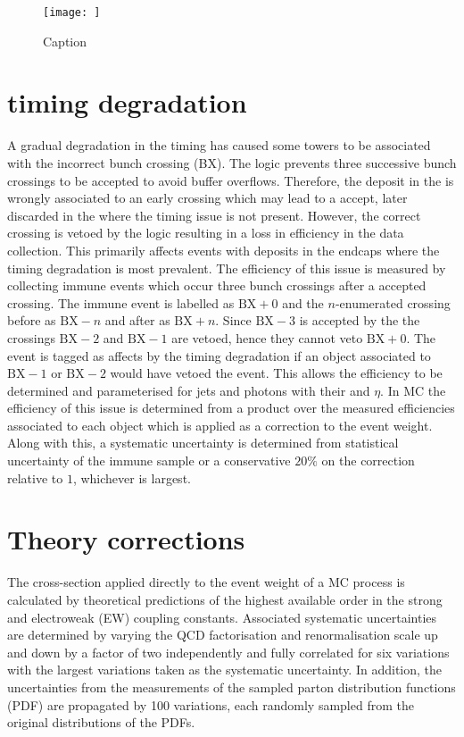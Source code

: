 \begin{figure}[htbp]
    \centering
    \texttt{[image: ]}
    \caption{Caption}
    \label{fig:pu-reweighting}
\end{figure}


\section{\ECAL timing degradation}

A gradual degradation in the \ECAL timing has caused some \HWT \ECAL towers to
be associated with the incorrect bunch crossing (BX). The \HWT logic prevents
three successive bunch crossings to be accepted to avoid buffer overflows.
Therefore, the deposit in the \ECAL is wrongly associated to an early crossing
which may lead to a \HWT accept, later discarded in the \SWT where the timing
issue is not present. However, the correct crossing is vetoed by the \HWT
logic resulting in a loss in efficiency in the data collection. This primarily
affects events with \ECAL deposits in the endcaps where the timing degradation
is most prevalent. The efficiency of this issue is measured by collecting
immune events which occur three bunch crossings after a \HWT accepted
crossing. The immune event is labelled as $\mathrm{BX}+0$ and the
$n$-enumerated crossing before as $\mathrm{BX}-n$ and after as
$\mathrm{BX}+n$. Since $\mathrm{BX}-3$ is accepted by the \HWT the crossings
$\mathrm{BX}-2$ and $\mathrm{BX}-1$ are vetoed, hence they cannot veto
$\mathrm{BX}+0$. The event is tagged as affects by the timing degradation if
an \HWT object associated to $\mathrm{BX}-1$ or $\mathrm{BX}-2$ would have
vetoed the event. This allows the efficiency to be determined and
parameterised for jets and photons with their \pt and $\eta$. In MC the
efficiency of this issue is determined from a product over the measured
efficiencies associated to each object which is applied as a correction to the
event weight. Along with this, a systematic uncertainty is determined from
statistical uncertainty of the immune sample or a conservative $20\%$ on the
correction relative to $1$, whichever is largest.


\section{Theory corrections}

The cross-section applied directly to the event weight of a MC process is
calculated by theoretical predictions of the highest available order in the
strong and electroweak (EW) coupling constants. Associated systematic
uncertainties are determined by varying the QCD factorisation and
renormalisation scale up and down by a factor of two independently and fully
correlated for six variations with the largest variations taken as the
systematic uncertainty. In addition, the uncertainties from the measurements
of the sampled \NNPDF parton distribution functions (PDF) \cite{Ball:2014uwa}
are propagated by 100 variations, each randomly sampled from the original
distributions of the PDFs.

